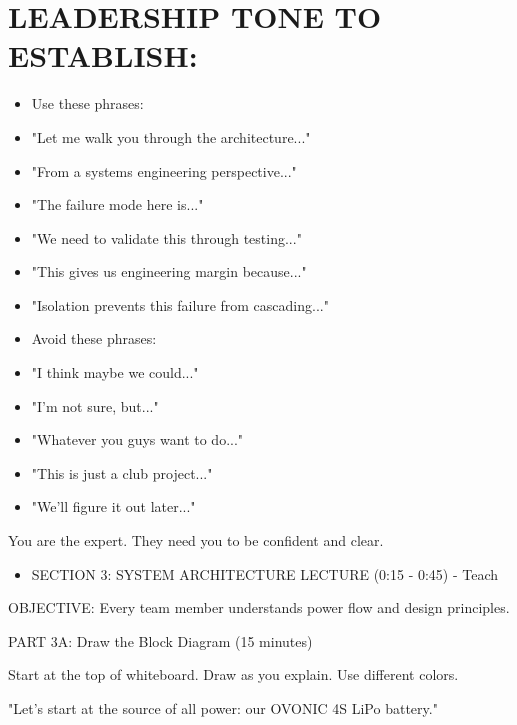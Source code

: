 \documentclass[11pt,letterpaper]{article}
\begin{document}
{\section{LEADERSHIP TONE TO ESTABLISH:}

\begin{itemize}
  \item Use these phrases:
  \item "Let me walk you through the architecture..."
  \item "From a systems engineering perspective..."
  \item "The failure mode here is..."
  \item "We need to validate this through testing..."
  \item "This gives us engineering margin because..."
  \item "Isolation prevents this failure from cascading..."
\end{itemize}

\begin{itemize}
  \item Avoid these phrases:
  \item "I think maybe we could..."
  \item "I'm not sure, but..."
  \item "Whatever you guys want to do..."
  \item "This is just a club project..."
  \item "We'll figure it out later..."
\end{itemize}

You are the expert. They need you to be confident and clear.\par

\begin{itemize}
  \item SECTION 3: SYSTEM ARCHITECTURE LECTURE (0:15 - 0:45) - Teach
\end{itemize}

OBJECTIVE: Every team member understands power flow and design principles.\par

PART 3A: Draw the Block Diagram (15 minutes)\par

Start at the top of whiteboard. Draw as you explain. Use different colors.\par

"Let's start at the source of all power: our OVONIC 4S LiPo battery."\par

}
\end{document}
